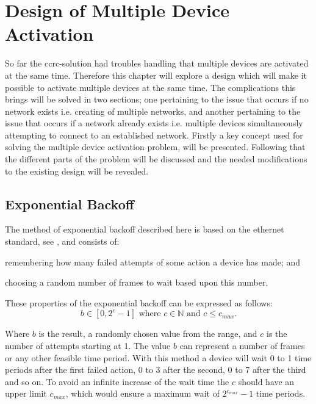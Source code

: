 \chapter{Design of Multiple Device Activation}\label{chap:MDA-CCRC}
So far the \gls{ccrc}-solution had troubles handling that multiple devices are activated at the same time.
Therefore this chapter will explore a design which will make it possible to activate multiple devices at the same time.
The complications this brings will be solved in two sections; one pertaining to the issue that occurs if no network exists i.e. creating of multiple networks, and another pertaining to the issue that occurs if a network already exists i.e. multiple devices simultaneously attempting to connect to an established network.
Firstly a key concept used for solving the multiple device activation problem, will be presented.
Following that the different parts of the problem will be discussed and the needed modifications to the existing design will be revealed.

\section{Exponential Backoff}
\label{sec:exponential_backoff}
The method of exponential backoff described here is based on the ethernet standard, see \citep{Ebackoff}, and consists of:
\begin{enumerate*}[label=\itshape \alph*\upshape)]
    \item remembering how many failed attempts of some action a device has made; and
    \item choosing a random number of frames to wait based upon this number.   
\end{enumerate*}
These properties of the exponential backoff can be expressed as follows:
\begin{equation}
     b \in [0, 2^c - 1] \text{ where } c \in \mathbb{N} \text{ and } {c \leq c_{max}}.
\end{equation}

\noindent
Where $b$ is the result, a randomly chosen value from the range, and $c$ is the number of attempts starting at 1. 
The value $b$ can represent a number of frames or any other feasible time period.
With this method a device will wait 0 to 1 time periods after the first failed action, 0 to 3 after the second, 0 to 7 after the third and so on. 
To avoid an infinite increase of the wait time the $c$ should have an upper limit $c_{max}$, which would ensure a maximum wait of $2^{c_{max}}-1$ time periods.







